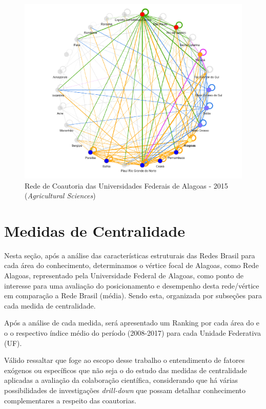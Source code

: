 \begin{figure}[H]
	\centering
	\includegraphics[scale=0.6]{Imagens/rede-agr-al-2015.pdf}
	\caption{Rede de Coautoria das Universidades Federais de Alagoas - 2015 (\textit{Agricultural Sciences})}
	\label{rede-2015-al}
\end{figure}

\section{\textbf{Medidas de Centralidade}}

Nesta seção, após a análise das características estruturais das Redes Brasil para cada área do conhecimento, determinamos o vértice focal de Alagoas, como Rede Alagoas, representado pela Universidade Federal de Alagoas, como ponto de interesse para uma avaliação do posicionamento e desempenho desta rede/vértice em comparação a Rede Brasil (média). Sendo esta, organizada por subseções para cada medida de centralidade.

Após a análise de cada medida, será apresentado um Ranking por cada área do e o o respectivo índice médio do período (2008-2017) para cada Unidade Federativa (UF). 

Válido ressaltar que foge ao escopo desse trabalho o entendimento de fatores exógenos ou específicos que não seja o do estudo das medidas de centralidade aplicadas a avaliação da colaboração científica, considerando que há várias possibilidades de investigações \textit{drill-down} que possam detalhar conhecimento complementares a respeito das coautorias.

